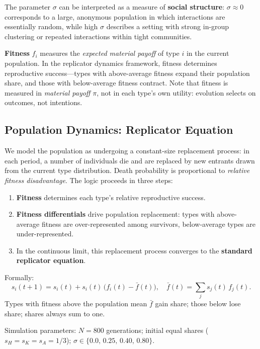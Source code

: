 \documentclass[12pt]{article}
\begin{document}
The parameter $\sigma$ can be interpreted as a measure of \textbf{social structure}: $\sigma \approx 0$ corresponds to a large, anonymous population in which interactions are essentially random, while high $\sigma$ describes a setting with strong in-group clustering or repeated interactions within tight communities.

\textbf{Fitness} $f_i$ measures the \emph{expected material payoff} of type $i$ in the current population. In the replicator dynamics framework, fitness determines reproductive success---types with above-average fitness expand their population share, and those with below-average fitness contract. Note that fitness is measured in \emph{material payoff} $\pi$, not in each type's own utility: evolution selects on outcomes, not intentions.

\subsection{Population Dynamics: Replicator Equation}

We model the population as undergoing a constant-size replacement process: in each period, a number of individuals die and are replaced by new entrants drawn from the current type distribution. Death probability is proportional to \emph{relative fitness disadvantage}. The logic proceeds in three steps:
\begin{enumerate}
    \item \textbf{Fitness} determines each type's relative reproductive success.
    \item \textbf{Fitness differentials} drive population replacement: types with above-average fitness are over-represented among survivors, below-average types are under-represented.
    \item In the continuous limit, this replacement process converges to the \textbf{standard replicator equation}.
\end{enumerate}

Formally:
\begin{equation}
    s_i(t+1) = s_i(t) + s_i(t)\,\bigl(f_i(t) - \bar{f}(t)\bigr),
    \quad \bar{f}(t) = \sum_j s_j(t)\,f_j(t).
\end{equation}
Types with fitness above the population mean $\bar{f}$ gain share; those below lose share; shares always sum to one.

Simulation parameters: $N = 800$ generations; initial equal shares ($s_H = s_K = s_A = 1/3$); $\sigma \in \{0.0,\, 0.25,\, 0.40,\, 0.80\}$.
\end{document}
